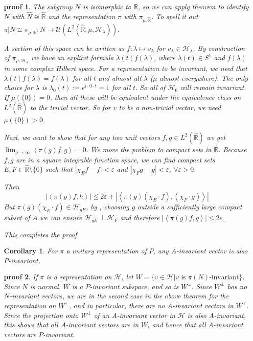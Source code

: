 \documentclass[
  12pt
]{article}
\theoremstyle{break}
\theoremstyle{plain}
\newtheorem{cor}[thm]{Corollary}
\newtheorem*{pf}{proof}
\newcommand{\mpi}{\ensuremath{\pi}\xspace}
\newcommand{\bbr}{\ensuremath{\mathbb{R}}\xspace}
\newcommand{\hilb}{\ensuremath{\mathscr{H}}\xspace}
\newcommand{\abs}[1]{| #1 |}
\newcommand{\inn}[1]{\left\langle #1 \right\rangle}
\begin{document}
  \begin{pf}
    The subgroup $N$ is isomorphic to \bbr, so we can apply theorem 
    to identify $N$ with $\hat{N} \cong \hat{\bbr}$ and the representation \mpi with $\pi_{\mu, \hat{\bbr}}$.
    To spell it out $\pi|N \cong \pi_{\mu, \hat{\bbr}}: N \rightarrow \mathcal{U}(L^2(\hat{\bbr}, \mu, \hilb_{\lambda}))$.

    A section of this space can be written as $f: \lambda \mapsto v_{\lambda}$ for $v_{\lambda} \in \hilb_{\lambda}$.
    By construction of $\pi_{\mu, \hilb_{\lambda}}$ we have an explicit formula $\lambda(t)f(\lambda)$, where $\lambda(t) \in S^1$ and $f(\lambda)$ in some complex Hilbert space.
    For a representation to be invariant, we need that $\lambda(t)f(\lambda) = f(\lambda)$ for all $t$ and almost all $\lambda$ ($\mu$ almost everywhere).
    The only choice for $\lambda$ is $\lambda_0(t) := e^{i \cdot 0 \cdot t} = 1$ for all $t$.
    So all of $\hilb_0$ will remain invariant.
    If $\mu(\{0\}) = 0$, then all these will be equivalent under the equivalence class on $L^2(\hat{\bbr})$ to the trivial vector.
    So for $v$ to be a non-trivial vector, we need $\mu(\{0\}) > 0$.

    Next, we want to show that for any two unit vectors $f, g \in L^2(\hat{\bbr})$ we get $\lim_{g\to\infty} \inn{\pi(g)f,g} = 0$.
    We move the problem to compact sets in $\hat{\bbr}$.
    Because $f,g$ are in a square integrable function space, we can find
    compact sets $E, F \in \hat{\bbr}\setminus \{0\}$ such that $\abs{\chi_Ef -
    f} < \varepsilon$ and $\abs{\chi_Fg -g} < \varepsilon$, $\forall
    \varepsilon > 0$.

    Then
    $$
    \abs{\inn{\pi(g)f, h}} \leq 2\varepsilon + \abs{\inn{\pi(g)(\chi_E\cdot f), (\chi_F \cdot g)}}
    $$
    But $\pi(g)(\chi_E\cdot f) \in \hilb_{gE}$, by , choosing $g$ outside a sufficiently large compact subset of $A$ we can ensure $\hilb_{gE}\perp \hilb_{F}$ and therefore $\abs{\inn{\pi(g)f, g}} \leq 2\varepsilon$.

    This completes the proof.

  \end{pf}

  \begin{cor}
    \label{cor:2.3.7}
    For \mpi a unitary representation of $P$, any $A$-invariant vector is also $P$-invariant.
  \end{cor}

  \begin{pf}
    If \mpi is a representation on \hilb, let $W=\{v \in \hilb|v \text{ is } \pi(N)\text{-invariant}\}$.
    Since $N$ is normal, $W$ is a $P$-invariant subspace, and so is $W^{\perp}$. 
    Since $W^{\perp}$ has no $N$-invariant vectors, we are in the second case
    in the above theorem for the representation on $W^{\perp}$, and in
    particular, there are no $A$-invariant vectors in $W^{\perp}$. Since the
    projection onto $W^{\perp}$ of an $A$-invariant vector in \hilb is also
    $A$-invariant, this shows that all $A$-invariant vectors are in $W$, and
    hence that all $A$-invariant vectors are $P$-invariant.
  \end{pf}
\end{document}
